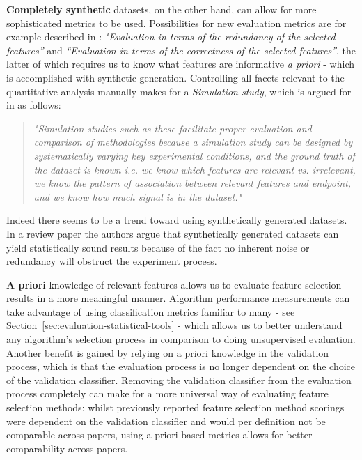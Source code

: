 \documentclass{article}
\begin{document}
\textbf{Completely synthetic} datasets, on the other hand, can allow for more sophisticated metrics to be used. Possibilities for new evaluation metrics are for example described in \citep{solorio2020review}: \textit{"Evaluation in terms of the redundancy of the selected features”} and \textit{“Evaluation in terms of the correctness of the selected features”}, the latter of which requires us to know what features are informative \textit{a priori} - which is accomplished with synthetic generation. Controlling all facets relevant to the quantitative analysis manually makes for a \textit{Simulation study}, which is argued for in \citep{urbanowicz2018benchmarking} as follows:

\begin{quote}
    \textit{"Simulation studies such as these facilitate proper evaluation and comparison of methodologies because a simulation study can be designed by systematically varying key experimental conditions, and the ground truth of the dataset is known i.e. we know which features are relevant vs. irrelevant, we know the pattern of association between relevant features and endpoint, and we know how much signal is in the dataset."}
\end{quote}

Indeed there seems to be a trend toward using synthetically generated datasets. In a review paper \citep{bolon2013review} the authors argue that synthetically generated datasets can yield statistically sound results because of the fact no inherent noise or redundancy will obstruct the experiment process.

\textbf{A priori} knowledge of relevant features allows us to evaluate feature selection results in a more meaningful manner. Algorithm performance measurements can take advantage of using classification metrics familiar to many - see Section~\ref{sec:evaluation-statistical-tools} - which allows us to better understand any algorithm's selection process in comparison to doing unsupervised evaluation. Another benefit is gained by relying on a priori knowledge in the validation process, which is that the evaluation process is no longer dependent on the choice of the validation classifier. Removing the validation classifier from the evaluation process completely can make for a more universal way of evaluating feature selection methods: whilst previously reported feature selection method scorings were dependent on the validation classifier and would per definition not be comparable across papers, using a priori based metrics allows for better comparability across papers.
\end{document}
